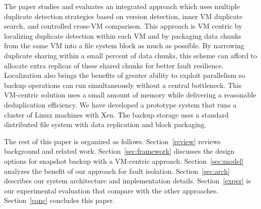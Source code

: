 The paper studies and evaluates  an integrated approach which uses  multiple duplicate detection strategies
based on  version  detection, inner VM duplicate search,
and controlled cross-VM comparison. 
This approach is VM centric by localizing duplicate detection within each VM  
and by packaging data chunks from the same VM into a file system block as much as possible.
By narrowing duplicate sharing within a small percent of data chunks,
this scheme can afford to allocate extra replicas of these shared chunks for better
fault resilience.
Localization also brings the benefits of greater ability to exploit parallelism so
backup operations can run simultaneously without a central  bottleneck.
This  VM-centric solution uses  a small amount of  memory while delivering a reasonable deduplication efficiency. 
We have developed a prototype system that runs a cluster of Linux machines with Xen.
The backup storage uses a standard distributed file system with data replication and block packaging.



The rest of this paper is organized as follows.
Section~\ref{review} reviews background and related work.
Section~\ref{sec:framework}  discusses the  design options for snapshot backup with a VM-centric approach. 
Section~\ref{sec:model}  analyzes the benefit of our approach for fault isolation. 
Section~\ref{sec:arch}  describes our system architecture and implementation details.
Section~\ref{exper} is our experimental evaluation that compare with the other approaches.
Section~\ref{conc}  concludes this paper.


